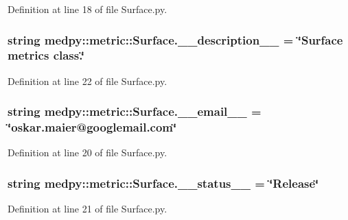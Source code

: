 Definition at line 18 of file Surface.py.

\hypertarget{namespacemedpy_1_1metric_1_1Surface_a410c4ce138aacce9152113e9f7124a51}{
\subsubsection[{\_\-\_\-description\_\-\_\-}]{\setlength{\rightskip}{0pt plus 5cm}string {\bf medpy::metric::Surface.\_\-\_\-description\_\-\_\-} = \char`\"{}Surface metrics class.\char`\"{}}}
\label{namespacemedpy_1_1metric_1_1Surface_a410c4ce138aacce9152113e9f7124a51}


Definition at line 22 of file Surface.py.

\hypertarget{namespacemedpy_1_1metric_1_1Surface_a384ea5bbe67f8e02ae76af36051b1126}{
\subsubsection[{\_\-\_\-email\_\-\_\-}]{\setlength{\rightskip}{0pt plus 5cm}string {\bf medpy::metric::Surface.\_\-\_\-email\_\-\_\-} = \char`\"{}oskar.maier@googlemail.com\char`\"{}}}
\label{namespacemedpy_1_1metric_1_1Surface_a384ea5bbe67f8e02ae76af36051b1126}


Definition at line 20 of file Surface.py.

\hypertarget{namespacemedpy_1_1metric_1_1Surface_af6d263a2c57ce317bd91c16461117193}{
\subsubsection[{\_\-\_\-status\_\-\_\-}]{\setlength{\rightskip}{0pt plus 5cm}string {\bf medpy::metric::Surface.\_\-\_\-status\_\-\_\-} = \char`\"{}Release\char`\"{}}}
\label{namespacemedpy_1_1metric_1_1Surface_af6d263a2c57ce317bd91c16461117193}


Definition at line 21 of file Surface.py.

